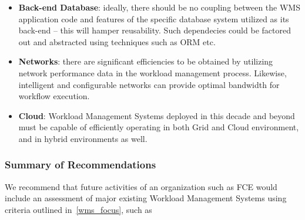 \begin{itemize}
\begin{itemize}
\end{itemize}

\item \textbf{Back-end Database}: ideally, there should be no coupling between the WMS application code and features of the specific database system
utilized as its back-end -- this will hamper reusability. Such dependecies could be factored out and abstracted using techniques such as ORM etc.

\item \textbf{Networks}: there are significant efficiencies to be obtained by utilizing network performance data in the workload management process. Likewise,
intelligent and configurable networks can provide optimal bandwidth for workflow execution.

\item \textbf{Cloud}: Workload Management Systems deployed in this decade and beyond must be capable of efficiently operating in both Grid and Cloud environment,
and in hybrid environments as well.

\end{itemize}

\subsubsection{Summary of Recommendations}
We recommend that future activities of an organization such as FCE would include an assessment of major existing Workload Management Systems
using criteria outlined in~\ref{wms_focus}, such as

